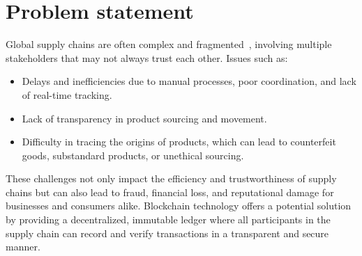 \section{Problem statement}

Global supply chains are often complex and fragmented~\cite{hbrSupplychain}, involving multiple stakeholders that may not always trust each other. Issues such as:
\begin{itemize}
    \item Delays and inefficiencies due to manual processes, poor coordination, and lack of real-time tracking.
    \item Lack of transparency in product sourcing and movement.
        \item
            Difficulty in tracing the origins of products, which can lead to counterfeit goods, substandard products, or unethical sourcing.
\end{itemize}
These challenges not only impact the efficiency and trustworthiness of supply chains but can also lead to fraud, financial loss, and reputational damage for businesses and consumers alike.
Blockchain technology offers a potential solution by providing a decentralized, immutable ledger where all participants in the supply chain can record and verify transactions in a transparent and secure manner.

